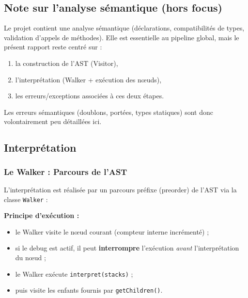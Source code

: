 \subsection{Note sur l'analyse sémantique (hors focus)}

Le projet contient une analyse sémantique (déclarations, compatibilités de types, validation d'appels de méthodes). Elle est essentielle au pipeline global, mais le présent rapport reste centré sur :
\begin{enumerate}
    \item la construction de l'AST (Visitor),
    \item l'interprétation (Walker + exécution des nœuds),
    \item les erreurs/exceptions associées à ces deux étapes.
\end{enumerate}

\noindent Les erreurs sémantiques (doublons, portées, types statiques) sont donc volontairement peu détaillées ici.

\subsection{Interprétation}

\subsubsection{Le Walker : Parcours de l'AST}

L'interprétation est réalisée par un parcours préfixe (preorder) de l'AST via la classe \texttt{Walker} :

\noindent\textbf{Principe d'exécution :}
\begin{itemize}
    \item le Walker visite le nœud courant (compteur interne incrémenté) ;
    \item si le debug est actif, il peut \textbf{interrompre} l'exécution \emph{avant} l'interprétation du nœud ;
    \item le Walker exécute \texttt{interpret(stacks)} ;
    \item puis visite les enfants fournis par \texttt{getChildren()}.
\end{itemize}

